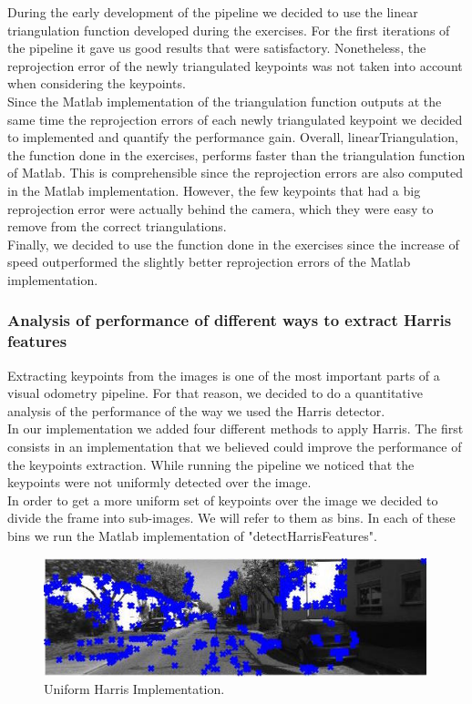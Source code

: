 During the early development of the pipeline we decided to use the linear triangulation function developed during the exercises.
For the first iterations of the pipeline it gave us good results that were satisfactory. Nonetheless, the reprojection error of the newly
triangulated keypoints was not taken into account when considering the keypoints. \\
Since the Matlab implementation of the triangulation function outputs at the same time the reprojection errors of each newly triangulated
keypoint we decided to implemented and quantify the performance gain.
Overall, linearTriangulation, the function done in the exercises, performs faster than the triangulation function of Matlab. This is
comprehensible since the reprojection errors are also computed in the Matlab implementation. However, the few keypoints that had a big reprojection error were actually behind the camera, which they were easy to remove from the correct triangulations. \\
Finally, we decided to use the function done in the exercises since the increase of speed outperformed the slightly better reprojection errors of the Matlab implementation.

\subsubsection{Analysis of performance of different ways to extract Harris features}

Extracting keypoints from the images is one of the most important parts of a visual odometry pipeline. For that reason, we
decided to do a quantitative analysis of the performance of the way we used the Harris detector. \\
In our implementation we added four different methods to apply Harris.
The first consists in an implementation that we believed could improve the performance of the keypoints extraction.
While running the pipeline we noticed that the keypoints were not uniformly detected over the image. \\
In order to get a more uniform set of keypoints over the image we decided to divide the frame into sub-images. We will refer to them
as bins. In each of these bins we run the Matlab implementation of "detectHarrisFeatures".

\begin{figure}
  \includegraphics[width=0.99\textwidth]{files/custom_uniform_keypoints.jpg}
  \caption[\label{f:custom_uniform}Uniform Harris Implementation]{Uniform Harris Implementation.}
\end{figure}


